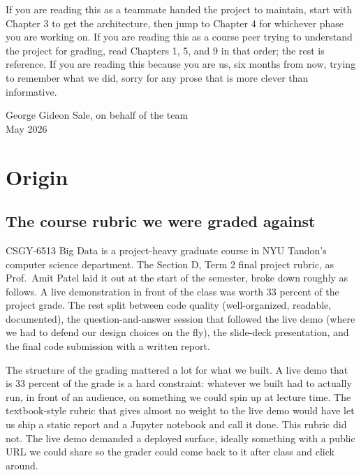 \documentclass[11pt,letterpaper]{book}
\begin{document}
If you are reading this as a teammate handed the project to maintain, start with Chapter 3 to get the architecture, then jump to Chapter 4 for whichever phase you are working on. If you are reading this as a course peer trying to understand the project for grading, read Chapters 1, 5, and 9 in that order; the rest is reference. If you are reading this because you are us, six months from now, trying to remember what we did, sorry for any prose that is more clever than informative.

\bigskip
\noindent\hfill George Gideon Sale, on behalf of the team \\
\noindent\hfill May 2026

\tableofcontents
\listoffigures
\listoftables

\mainmatter

\chapter{Origin}
\label{ch:origin}

\section{The course rubric we were graded against}

CSGY-6513 Big Data is a project-heavy graduate course in NYU Tandon's computer science department. The Section D, Term 2 final project rubric, as Prof.\ Amit Patel laid it out at the start of the semester, broke down roughly as follows. A live demonstration in front of the class was worth 33 percent of the project grade. The rest split between code quality (well-organized, readable, documented), the question-and-answer session that followed the live demo (where we had to defend our design choices on the fly), the slide-deck presentation, and the final code submission with a written report.

The structure of the grading mattered a lot for what we built. A live demo that is 33 percent of the grade is a hard constraint: whatever we built had to actually run, in front of an audience, on something we could spin up at lecture time. The textbook-style rubric that gives almost no weight to the live demo would have let us ship a static report and a Jupyter notebook and call it done. This rubric did not. The live demo demanded a deployed surface, ideally something with a public URL we could share so the grader could come back to it after class and click around.
\end{document}
